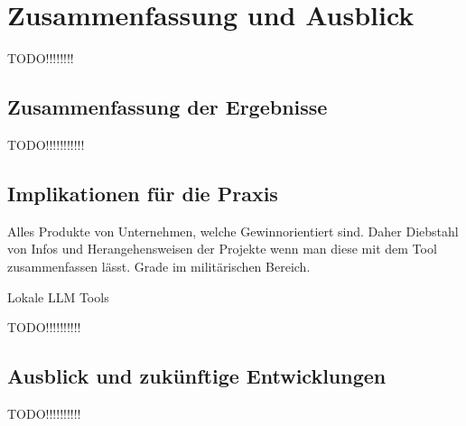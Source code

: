 
\chapter{Zusammenfassung und Ausblick} 

TODO!!!!!!!!

\section{Zusammenfassung der Ergebnisse}  \label{Zusammenfassung der Ergebnisse}

TODO!!!!!!!!!!!

\section{Implikationen für die Praxis}  \label{Implikationen für die Praxis}

Alles Produkte von Unternehmen, welche Gewinnorientiert sind. Daher Diebstahl von Infos und Herangehensweisen der Projekte 
wenn man diese mit dem Tool zusammenfassen lässt. Grade im militärischen Bereich.

Lokale LLM Tools

TODO!!!!!!!!!!

\section{Ausblick und zukünftige Entwicklungen}  \label{Ausblick und zukünftige Entwicklungen}

TODO!!!!!!!!!!